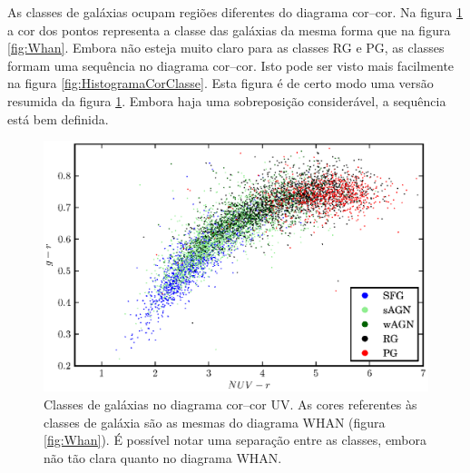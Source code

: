 As classes de galáxias ocupam regiões diferentes do diagrama cor--cor. Na figura
\ref{fig:ColorClass} a cor dos pontos representa a classe das galáxias da mesma
forma que na figura \ref{fig:Whan}. Embora não esteja muito claro para as
classes RG e PG, as classes formam uma sequência no diagrama cor--cor. Isto pode
ser visto mais facilmente na figura \ref{fig:HistogramaCorClasse}. Esta figura é
de certo modo uma versão resumida da figura \ref{fig:ColorClass}. Embora haja
uma sobreposição considerável, a sequência está bem definida.

\begin{figure}
	\includegraphics{figuras/uvcolor-color-class.eps}
	\caption[Diagrama cor--cor UV de acordo com o tipo de galáxia.]
	{Classes de galáxias no diagrama cor--cor UV. As cores referentes às classes de
	galáxia são as mesmas do diagrama WHAN (figura \ref{fig:Whan}). É possível
	notar uma separação entre as classes, embora não tão clara quanto no diagrama
	WHAN.}
	\label{fig:ColorClass}
\end{figure}

